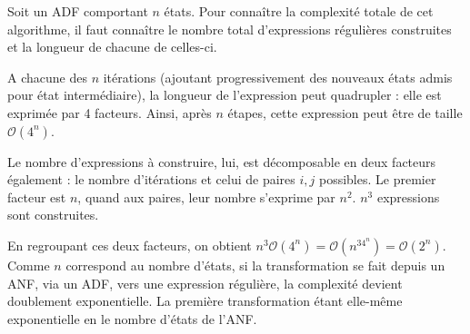 \begin{complexity}
	Soit un ADF \automaton comportant $n$ états. Pour connaître la complexité totale de cet algorithme, il faut connaître le nombre total d'expressions régulières construites et la longueur de chacune de celles-ci.

	A chacune des $n$ itérations (ajoutant progressivement des nouveaux états admis pour état intermédiaire), la longueur de l'expression peut quadrupler : elle est exprimée par 4 facteurs. Ainsi, après $n$ étapes, cette expression peut être de taille $\mathcal{O}(4^n)$.

	Le nombre d'expressions à construire, lui, est décomposable en deux facteurs également : le nombre d'itérations et celui de paires $i,j$ possibles. Le premier facteur est $n$, quand aux paires, leur nombre s'exprime par $n^2$. $n^3$ expressions sont construites.

	En regroupant ces deux facteurs, on obtient $n^3\mathcal{O}(4^n)=\mathcal{O}(n^34^n)=\mathcal{O}(2^n)$. Comme $n$ correspond au nombre d'états, si la transformation se fait depuis un ANF, via un ADF, vers une expression régulière, la complexité devient doublement exponentielle. La première transformation étant elle-même exponentielle en le nombre d'états de l'ANF.
\end{complexity}



